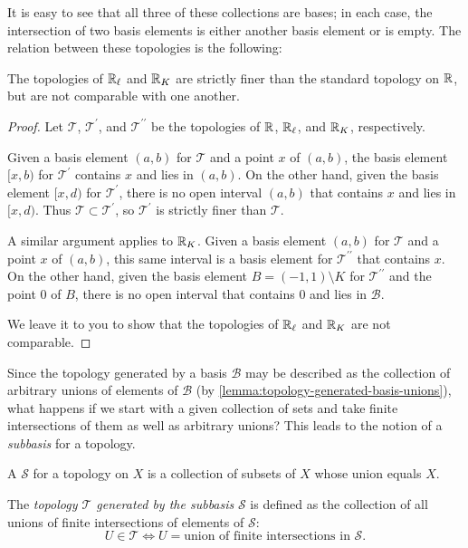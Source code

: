 It is easy to see that all three of these collections are bases; in each case, the intersection of two basis elements is either another basis element or is empty. The relation between these topologies is the following:

\begin{lemma}
The topologies of $\mathbb R_\ell$ and $\mathbb R_K$ are strictly finer than the standard topology on $\mathbb R$, but are not comparable with one another.
\end{lemma}

\begin{proof}
Let $\mathcal{T}$, $\mathcal{T}^\prime$, and $\mathcal{T}^{\prime\prime}$ be the topologies of $\mathbb R$, $\mathbb R_\ell$, and $\mathbb R_K$, respectively. 

Given a basis element $(a,b)$ for $\mathcal{T}$ and a point $x$ of $(a,b)$, the basis element $[x,b)$ for $\mathcal{T}^\prime$ contains $x$ and lies in $(a,b)$. On the other hand, given the basis element $[x,d)$ for $\mathcal{T}^\prime$, there is no open interval $(a,b)$ that contains $x$ and lies in $[x,d)$. Thus $\mathcal{T}\subset\mathcal{T}^\prime$, so $\mathcal{T}^\prime$ is strictly finer than $\mathcal{T}$.

A similar argument applies to $\mathbb R_K$. Given a basis element $(a,b)$ for $\mathcal{T}$ and a point $x$ of $(a,b)$, this same interval is a basis element for $\mathcal{T}^{\prime\prime}$ that contains $x$. On the other hand, given the basis element $B=(-1,1)\setminus K$ for $\mathcal{T}^{\prime\prime}$ and the point $0$ of $B$, there is no open interval that contains $0$ and lies in $\mathcal{B}$.

We leave it to you to show that the topologies of $\mathbb R_\ell$ and $\mathbb R_K$ are not comparable.
\end{proof}

Since the topology generated by a basis $\mathcal{B}$ may be described as the collection of arbitrary unions of elements of $\mathcal{B}$ (by \ref{lemma:topology-generated-basis-unions}), what happens if we start with a given collection of sets and take finite intersections of them as well as arbitrary unions? 
This leads to the notion of a \emph{subbasis} for a topology.

\begin{definition}[Subbasis]
A  $\mathcal{S}$ for a topology on $X$ is a collection of subsets of $X$ whose union equals $X$.
\end{definition}

\begin{definition}
The \emph{topology $\mathcal{T}$ generated by the subbasis} $\mathcal{S}$ is defined as the collection of all unions of finite intersections of elements of $\mathcal{S}$:
\[U\in\mathcal{T}\iff U=\text{union of finite intersections in }\mathcal{S}.\]
\end{definition}

